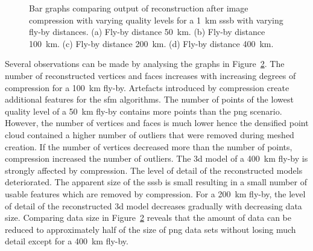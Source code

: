 \begin{figure}[htb]
\begin{subfigure}[b]{0.49\textwidth}
            \caption{}
            \label{fig:recon_120_400_1}
        \end{subfigure}
    \caption{Bar graphs comparing output of reconstruction after image compression with varying quality levels for a \SI{1}{\kilo\meter} \gls{sssb} with varying fly-by distances. (a) Fly-by distance \SI{50}{\kilo\meter}. (b) Fly-by distance \SI{100}{\kilo\meter}. (c) Fly-by distance \SI{200}{\kilo\meter}. (d) Fly-by distance \SI{400}{\kilo\meter}.}
    \label{fig:recon_stats_1}
\end{figure}

Several observations can be made by analysing the graphs in Figure~\ref{fig:recon_stats_1}. The number of reconstructed vertices and faces increases with increasing degrees of compression for a \SI{100}{\kilo\meter} fly-by. Artefacts introduced by compression create additional features for the \gls{sfm} algorithms. The number of points of the lowest quality level of a \SI{50}{\kilo\meter} fly-by contains more points than the \gls{png} scenario. However, the number of vertices and faces is much lower hence the densified point cloud contained a higher number of outliers that were removed during meshed creation. If the number of vertices decreased more than the number of points, compression increased the number of outliers. The \gls{3d} model of a \SI{400}{\kilo\meter} fly-by is strongly affected by compression. The level of detail of the reconstructed models deteriorated. The apparent size of the \gls{sssb} is small resulting in a small number of usable features which are removed by compression. For a \SI{200}{\kilo\meter} fly-by, the level of detail of the reconstructed \gls{3d} model decreases gradually with decreasing data size. Comparing data size in Figure~\ref{fig:recon_stats_1} reveals that the amount of data can be reduced to approximately half of the size of \gls{png} data sets without losing much detail except for a \SI{400}{\kilo\meter} fly-by.


